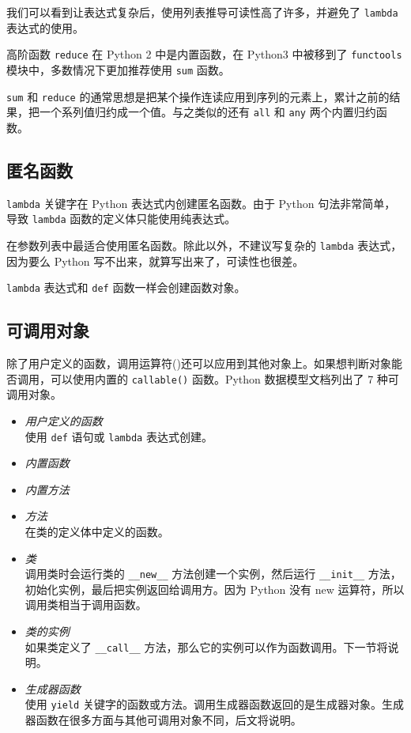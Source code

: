 

我们可以看到让表达式复杂后，使用列表推导可读性高了许多，并避免了 \texttt{lambda} 表达式的使用。

高阶函数 \texttt{reduce} 在 Python 2 中是内置函数，在 Python3 中被移到了 \texttt{functools} 模块中，多数情况下更加推荐使用 \texttt{sum} 函数。



\texttt{sum} 和 \texttt{reduce} 的通常思想是把某个操作连读应用到序列的元素上，累计之前的结果，把一个系列值归约成一个值。与之类似的还有 \texttt{all} 和 \texttt{any} 两个内置归约函数。 

\subsection{匿名函数}

\texttt{lambda} 关键字在 Python 表达式内创建匿名函数。由于 Python 句法非常简单，导致 \texttt{lambda} 函数的定义体只能使用纯表达式。

在参数列表中最适合使用匿名函数。除此以外，不建议写复杂的 \texttt{lambda} 表达式，因为要么 Python 写不出来，就算写出来了，可读性也很差。



\texttt{lambda} 表达式和 \texttt{def} 函数一样会创建函数对象。

\subsection{可调用对象}

除了用户定义的函数，调用运算符()还可以应用到其他对象上。如果想判断对象能否调用，可以使用内置的 \texttt{callable()} 函数。Python 数据模型文档列出了 7 种可调用对象。

\begin{itemize}
    \item \textit{用户定义的函数} \\
    使用 \texttt{def} 语句或 \texttt{lambda} 表达式创建。
    \item \textit{内置函数} 
    \item \textit{内置方法} 
    \item \textit{方法} \\
    在类的定义体中定义的函数。
    \item \textit{类} \\
    调用类时会运行类的 \texttt{\_\_new\_\_} 方法创建一个实例，然后运行 \texttt{\_\_init\_\_} 方法，初始化实例，最后把实例返回给调用方。因为 Python 没有 new 运算符，所以调用类相当于调用函数。
    \item \textit{类的实例} \\
    如果类定义了 \texttt{\_\_call\_\_} 方法，那么它的实例可以作为函数调用。下一节将说明。
    \item \textit{生成器函数} \\
    使用 \texttt{yield} 关键字的函数或方法。调用生成器函数返回的是生成器对象。生成器函数在很多方面与其他可调用对象不同，后文将说明。
\end{itemize}


